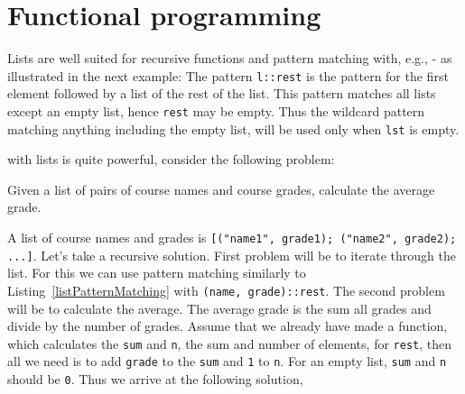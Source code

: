 \chapter{Functional programming}
\label{chap:functional}

Lists are well suited for recursive functions and pattern matching with, e.g., - as illustrated in the next example:
%
%
The pattern \lstinline!l::rest! is the pattern for the first element followed by a list of the rest of the list. This pattern matches all lists except an empty list, hence \lstinline!rest! may be empty. Thus the wildcard pattern matching anything including the empty list, will be used only when \lstinline!lst! is empty.

 with lists is quite powerful, consider the following problem:
\begin{problem}
  Given a list of pairs of course names and course grades, calculate the average grade.
\end{problem}
A list of course names and grades is \lstinline![("name1", grade1); ("name2", grade2); ...]!. Let's take a recursive solution. First problem will be to iterate through the list. For this we can use pattern matching similarly to Listing~\ref{listPatternMatching} with \lstinline!(name, grade)::rest!. The second problem will be to calculate the average. The average grade is the sum all grades and divide by the number of grades. Assume that we already have made a function, which calculates the \lstinline!sum! and \lstinline!n!, the sum and number of elements, for \lstinline!rest!, then all we need is to add \lstinline!grade! to the \lstinline!sum! and \lstinline!1! to \lstinline!n!. For an empty list, \lstinline!sum! and \lstinline!n! should be \lstinline!0!. Thus we arrive at the following solution,
%
%

